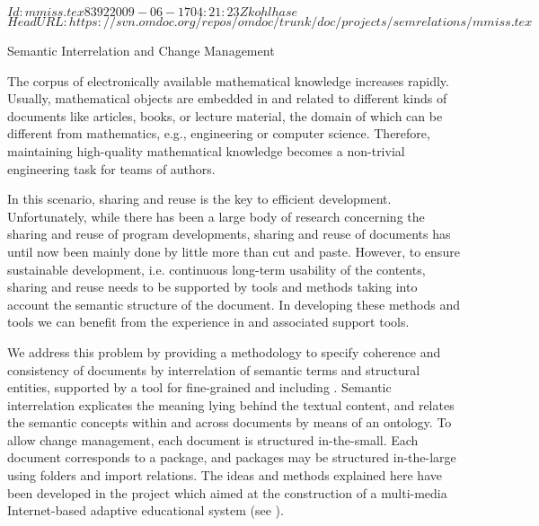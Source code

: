 \svnInfo $Id: mmiss.tex 8392 2009-06-17 04:21:23Z kohlhase $
\svnKeyword $HeadURL: https://svn.omdoc.org/repos/omdoc/trunk/doc/projects/semrelations/mmiss.tex $

\begin{omgroup}[id=MMiSS,creators={bkb,amahnke}]
  {Semantic Interrelation and Change Management}

The corpus of electronically available mathematical knowledge increases rapidly.  Usually,
mathematical objects are embedded in and related to different kinds of documents like
articles, books, or lecture material, the domain of which can be different from
mathematics, e.g., engineering or computer science. Therefore, maintaining high-quality
mathematical knowledge becomes a non-trivial engineering task for teams of authors.

In this scenario, sharing and reuse is the
key to efficient development. Unfortunately, while there has been a large body of research
concerning the sharing and reuse of program developments, sharing and reuse of documents
has until now been mainly done by little more than cut and paste.  However, to ensure
sustainable development, i.e. continuous long-term usability of the contents, sharing and
reuse needs to be supported by tools and methods taking into account the semantic
structure of the document. In developing these methods and tools we can benefit from the
experience in {} and associated support tools.

We address this problem by providing a methodology to specify coherence and consistency of
documents by interrelation of semantic terms and structural entities, supported by a tool
for fine-grained {} and {}
including {}. Semantic
interrelation explicates the meaning lying behind the
textual content, and relates the semantic concepts within and across documents by means of
an ontology. To allow change management, each document is structured in-the-small.  Each
document corresponds to a package, and packages may be structured in-the-large using
folders and import relations. The ideas and methods explained here have been developed in
the \MMISS{} project which aimed at the construction of a multi-media Internet-based
adaptive educational system (see \cite{KriHut:MMiSS03,SemInter-DELFI04,MMISS-TechReport04}).


\end{omgroup}
